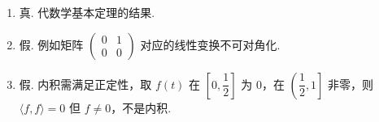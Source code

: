 \begin{enumerate}
\begin{enumerate}
        \item 真. 代数学基本定理的结果.

        \item 假. 例如矩阵 $\begin{pmatrix}0&1\\0&0\end{pmatrix}$ 对应的线性变换不可对角化.

        \item 假. 内积需满足正定性，取 $f(t)$ 在 $\left[0,\dfrac{1}{2}\right]$ 为 $0$，在 $\left(\dfrac{1}{2},1\right]$ 非零，则 $\langle f,f \rangle=0$ 但 $f\neq 0$，不是内积.
    \end{enumerate}
\end{enumerate}

\clearpage

